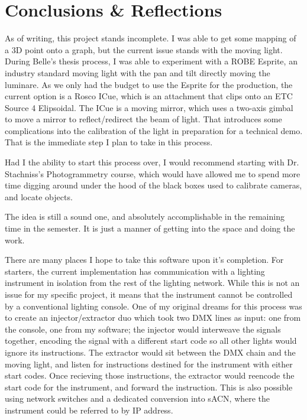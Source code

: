 \documentclass[
    12pt,
    twoside,
    bibstyle=chicago,
    headerstyle=uppercase,
	bibfile=biblatex_updating.bib
]{reedthesis}
\begin{document}
\chapter*{Conclusions \& Reflections}
	\setcounter{chapter}{4}
	\setcounter{section}{0}
	
As of writing, this project stands incomplete. I was able to get some mapping of a 3D point onto a graph, but the current issue stands with the moving light. During Belle's thesis process, I was able to experiment with a ROBE Esprite, an industry standard moving light with the pan and tilt directly moving the luminare. As we only had the budget to use the Esprite for the production, the current option is a Rosco ICue, which is an attachment that clips onto an ETC Source 4 Elipsoidal. The ICue is a moving mirror, which uses a two-axis gimbal to move a mirror to reflect/redirect the beam of light. That introduces some complications into the calibration of the light in preparation for a technical demo. That is the immediate step I plan to take in this process.

Had I the ability to start this process over, I would recommend starting with Dr. Stachniss's Photogrammetry course, which would have allowed me to spend more time digging around under the hood of the black boxes used to calibrate cameras, and locate objects.

The idea is still a sound one, and absolutely accomplishable in the remaining time in the semester. It is just a manner of getting into the space and doing the work.

There are many places I hope to take this software upon it's completion. For starters, the current implementation has communication with a lighting instrument in isolation from the rest of the lighting network. While this is not an issue for my specific project, it means that the instrument cannot be controlled by a conventional lighting console. One of my original dreams for this process was to create an injector/extractor duo which took two DMX lines as input: one from the console, one from my software; the injector would interweave the signals together, encoding the signal with a different start code so all other lights would ignore its instructions. The extractor would sit between the DMX chain and the moving light, and listen for instructions destined for the instrument with either start codes. Once recieving those instructions, the extractor would reencode the start code for the instrument, and forward the instruction. This is also possible using network switches and a dedicated conversion into sACN, where the instrument could be referred to by IP address.
\end{document}

